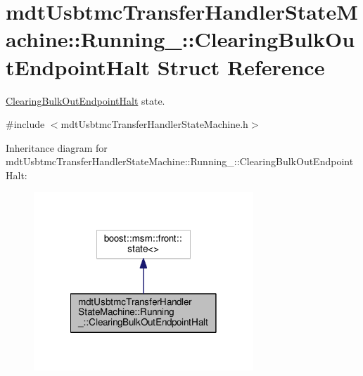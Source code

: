 \hypertarget{structmdt_usbtmc_transfer_handler_state_machine_1_1_running___1_1_clearing_bulk_out_endpoint_halt}{\section{mdt\-Usbtmc\-Transfer\-Handler\-State\-Machine\-:\-:Running\-\_\-\-:\-:Clearing\-Bulk\-Out\-Endpoint\-Halt Struct Reference}
\label{structmdt_usbtmc_transfer_handler_state_machine_1_1_running___1_1_clearing_bulk_out_endpoint_halt}
}


\hyperlink{structmdt_usbtmc_transfer_handler_state_machine_1_1_running___1_1_clearing_bulk_out_endpoint_halt}{Clearing\-Bulk\-Out\-Endpoint\-Halt} state.  




{\ttfamily \#include $<$mdt\-Usbtmc\-Transfer\-Handler\-State\-Machine.\-h$>$}



Inheritance diagram for mdt\-Usbtmc\-Transfer\-Handler\-State\-Machine\-:\-:Running\-\_\-\-:\-:Clearing\-Bulk\-Out\-Endpoint\-Halt\-:\nopagebreak
\begin{figure}[H]
\begin{center}
\leavevmode
\includegraphics[width=234pt]{structmdt_usbtmc_transfer_handler_state_machine_1_1_running___1_1_clearing_bulk_out_endpoint_halt__inherit__graph}
\end{center}
\end{figure}


